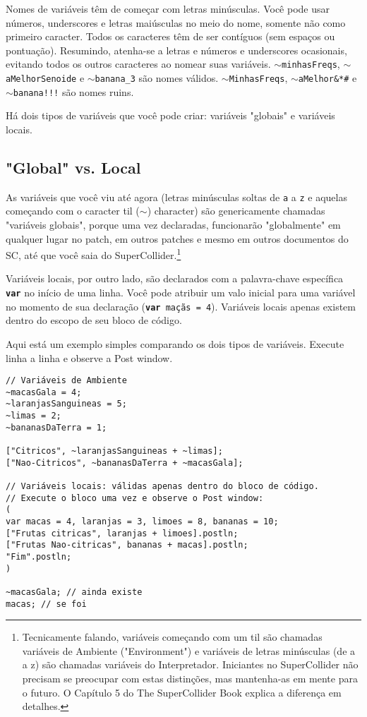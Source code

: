 Nomes de variáveis têm de começar com letras minúsculas. Você pode usar números, underscores e letras maiúsculas no meio do nome, somente não como primeiro caracter. Todos os caracteres têm de ser contíguos (sem espaços ou pontuação). Resumindo, atenha-se a letras e números e underscores ocasionais, evitando todos os outros caracteres ao nomear suas variáveis. \texttt{$\sim$minhasFreqs}, \texttt{$\sim$aMelhorSenoide} e \texttt{$\sim$banana\_3} são nomes válidos. \texttt{$\sim$MinhasFreqs}, \texttt{$\sim$aMelhor\&*\#\@Senoide} e \texttt{$\sim$banana!!!} são nomes ruins.

Há dois tipos de variáveis que você pode criar: variáveis "globais" e variáveis locais.

\subsection{"Global" vs. Local}

As variáveis que você viu até agora (letras minúsculas soltas de \texttt{a} a \texttt{z} e aquelas começando com o caracter til ($\sim$) character) são genericamente chamadas "variáveis globais", porque uma vez declaradas, funcionarão "globalmente" em qualquer lugar no patch, em outros patches e mesmo em outros documentos do SC, até que você saia do SuperCollider.\footnote{Tecnicamente falando, variáveis começando com um til são chamadas variáveis de Ambiente ("Environment") e variáveis de letras minúsculas (de a a z) são chamadas variáveis do Interpretador. Iniciantes no SuperCollider não precisam se preocupar com estas distinções, mas mantenha-as em mente para o futuro. O Capítulo 5 do The SuperCollider Book explica a diferença em detalhes.}

Variáveis locais, por outro lado, são declarados com a palavra-chave específica \texttt{\textbf{var}} no início de uma linha. Você pode atribuir um valo inicial para uma variável no momento de sua declaração (\texttt{\textbf{var} maçãs = 4}). Variáveis locais apenas existem dentro do escopo de seu bloco de código.

Aqui está um exemplo simples comparando os dois tipos de variáveis. Execute linha a linha e observe a Post window.

 
\begin{lstlisting}[style=SuperCollider-IDE, basicstyle=\scttfamily\footnotesize]
// Variáveis de Ambiente
~macasGala = 4;
~laranjasSanguineas = 5;
~limas = 2;
~bananasDaTerra = 1;

["Citricos", ~laranjasSanguineas + ~limas];
["Nao-Citricos", ~bananasDaTerra + ~macasGala];

// Variáveis locais: válidas apenas dentro do bloco de código.
// Execute o bloco uma vez e observe o Post window:
(
var macas = 4, laranjas = 3, limoes = 8, bananas = 10;
["Frutas citricas", laranjas + limoes].postln;
["Frutas Nao-citricas", bananas + macas].postln;
"Fim".postln;
)

~macasGala; // ainda existe
macas; // se foi
\end{lstlisting}

